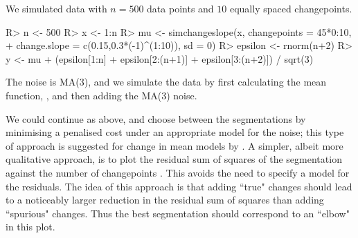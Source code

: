 \documentclass[nojss]{jss}
\begin{document}
We simulated data with $n=500$ data points and $10$ equally spaced changepoints.
\begin{CodeChunk}
\begin{CodeInput}
R> n <- 500
R> x <- 1:n
R> mu <- simchangeslope(x, changepoints = 45*0:10, 
+  change.slope = c(0.15,0.3*(-1)^(1:10)), sd = 0)
R> epsilon <- rnorm(n+2)
R> y <- mu + (epsilon[1:n] + epsilon[2:(n+1)] + epsilon[3:(n+2)]) / sqrt(3)
\end{CodeInput}
\end{CodeChunk}
The noise is MA(3), and we simulate the data by first calculating the mean function, , and then adding the MA(3) noise.

We could continue as above, and choose between the segmentations by minimising a penalised cost under an appropriate model for the noise; this type of approach is suggested for change in mean models by \cite{cho2020multiple}. A simpler, albeit more qualitative approach, is to plot the residual sum of squares of the segmentation against the number of changepoints \citep{lebarbier2005detecting,baudry2012slope,fearnhead2020relating,fryzlewicz2020detecting}. This avoids the need to specify a model for the residuals. The idea of this approach is that adding ``true" changes should lead to a noticeably larger reduction in the residual sum of squares than adding ``spurious" changes. Thus the best segmentation should correspond to an ``elbow" in this plot.
\end{document}
